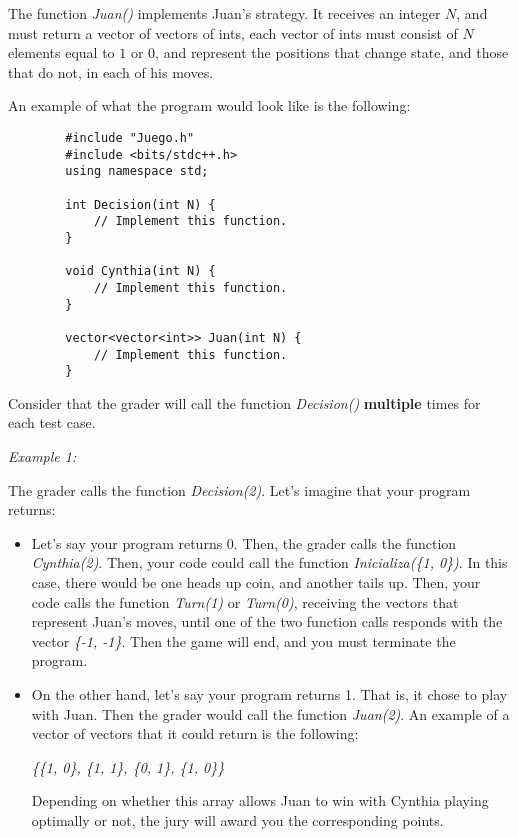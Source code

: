 \documentclass[12pt]{scrartcl}
\begin{document}
    The function \textit{Juan()} implements Juan's strategy. It receives an integer $N$, and must return a vector of vectors of ints, each vector of ints must consist of $N$ elements equal to $1$ or $0$, and represent the positions that change state, and those that do not, in each of his moves.

    An example of what the program would look like is the following:

    \begin{verbatim}
        #include "Juego.h"
        #include <bits/stdc++.h>
        using namespace std;

        int Decision(int N) {
            // Implement this function.
        }

        void Cynthia(int N) {
            // Implement this function.
        }

        vector<vector<int>> Juan(int N) {
            // Implement this function.
        }
    \end{verbatim}

    Consider that the grader will call the function \textit{Decision()} \textbf{multiple} times for each test case.


    {\itshape Example 1:}

        The grader calls the function \textit{Decision(2)}. Let's imagine that your program returns:

        \begin{itemize}
            \item Let's say your program returns 0. Then, the grader calls the function \textit{Cynthia(2)}. Then, your code could call the function \textit{Inicializa(\{1, 0\})}. In this case, there would be one heads up coin, and another tails up. 
            Then, your code calls the function \textit{Turn(1)} or \textit{Turn(0)}, receiving the vectors that represent Juan's moves, until one of the two function calls responds with the vector \textit{\{-1, -1\}}. Then the game will end, and you must terminate the program.
            \item On the other hand, let's say your program returns 1. That is, it chose to play with Juan. Then the grader would call the function \textit{Juan(2)}. An example of a vector of vectors that it could return is the following:

            \begin{center}
                {\itshape \{\{1, 0\}, \{1, 1\}, \{0, 1\}, \{1, 0\}\} }
            \end{center}

            Depending on whether this array allows Juan to win with Cynthia playing optimally or not, the jury will award you the corresponding points.
            
        \end{itemize}
\end{document}
